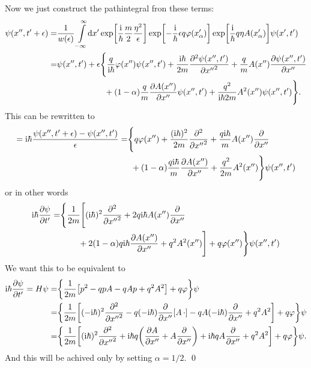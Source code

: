 \documentclass[11pt,letter, swedish, english
]{article}
\begin{document}
Now we just construct the pathintegral fron these terms:
\begin{equation}
\begin{aligned}
\psi(x'', t'+\epsilon)
=&\frac{1}{w(\epsilon)}\int_{-\infty}^{\infty}\!\rd{x'}
\exp[\frac{\ii}{\hbar}\frac{m}{2}\frac{\eta^2}{\epsilon}]
\exp[-\frac{\ii}{\hbar}\epsilon q\varphi(x'_\alpha)]
\exp[\frac{\ii}{\hbar} q\eta A(x'_\alpha)]
\psi(x', t')\\
=& \psi(x'', t') + \epsilon \Bigg\{
\frac{q}{\ii\hbar}\varphi(x'')\psi(x'', t')
+\frac{\ii\hbar}{2m}\pdv[2]{\psi(x'', t')}{{x''}}
+\frac{q}{m}A(x'')\pdv{\psi(x'', t')}{x''}\\
&\phantom{\psi(x'', t') + \epsilon\{ }
+(1-\alpha)\frac{q}{m}\pdv{A(x'')}{x''}\psi(x'', t')
+\frac{q^2}{\ii\hbar2m}A^2(x'')\psi(x'', t')
\Bigg\}.
\end{aligned}
\end{equation}
This can be rewritten to%
\begin{equation}
\begin{aligned}
=\mathrm{i}\hbar\frac{\psi(x'', t'+\epsilon)-\psi(x'', t')}{\epsilon}
=&  \Bigg\{
q\varphi(x'')
+\frac{(\mathrm{i}\hbar)^2}{2m}\pdv[2]{{x''}}
+\frac{q\mathrm{i}\hbar}{m}A(x'')\pdv{x''}\\
&\phantom{(}
+(1-\alpha)\frac{q\mathrm{i}\hbar}{m}\pdv{A(x'')}{x''}
+\frac{q^2}{2m}A^2(x'')
\Bigg\}\psi(x'', t')
\end{aligned}
\end{equation}
or in other words
\begin{equation}
\begin{aligned}
\mathrm{i}\hbar\pdv{\psi}{{t'}}
=&  \Bigg\{\frac{1}{2m}\Bigg[
(\mathrm{i}\hbar)^2\pdv[2]{{x''}}
+2q\mathrm{i}\hbar A(x'')\pdv{x''}\\
&\phantom{(2m)}
+2(1-\alpha)q\mathrm{i}\hbar\pdv{A(x'')}{x''}
+q^2A^2(x'')\Bigg]
+q\varphi(x'')\Bigg\}\psi(x'', t')
\end{aligned}
\end{equation}
We want this to be equivalent to 
\begin{equation}
\begin{aligned}
\mathrm{i}\hbar\pdv{\psi}{{t'}}
=H\psi
=&\qty{\frac{1}{2m}\qty[p^2 - qpA-qAp+q^2A^2] + q\varphi}\psi\\
=&\qty{\frac{1}{2m}\qty[(-\mathrm{i}\hbar)^2\pdv[2]{{x''}} 
- q(-\mathrm{i}\hbar) \pdv{x''}[A\,\cdot]
-qA(-\mathrm{i}\hbar)\pdv{x''}+q^2A^2] + q\varphi}\psi\\
=&\qty{\frac{1}{2m}\qty[(\mathrm{i}\hbar)^2\pdv[2]{{x''}} 
+ \mathrm{i}\hbar q\qty(\pdv{A}{x''}+A\pdv{x''})
+\mathrm{i}\hbar qA\pdv{x''}+q^2A^2] + q\varphi}\psi.
\end{aligned}
\end{equation}
And this will be achived only by setting $\alpha=1/2$.
\qed
\end{document}
